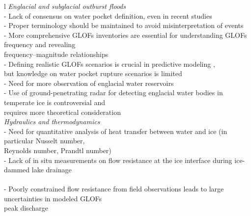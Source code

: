 \begin{table}[h]
\begin{tabular}{l}
\textit{Englacial and subglacial outburst floods}   \\
\hline
- Lack of consensus on water pocket definition, even in recent studies {\citep{Lutzow&al2023,Zhang&al2024}} \\
- Proper terminology should be maintained to avoid misinterpretation of events {\citep{Emmer&al2022}} \\
- More comprehensive GLOFs inventories are essential for understanding GLOFs frequency and revealing\\ frequency–magnitude relationships {\citep{Veh&al2022,Emmer&al2022}} \\
- Defining realistic GLOFs scenarios is crucial in predictive modeling {\citep{Emmer&al2022,Zhang&al2024}},\\ but knowledge on water pocket rupture scenarios is limited {\citep{Haeberli1983}} \\
- Need for more observation of englacial water reservoirs {\citep{Haeberli1983}} \\
- Use of ground-penetrating radar for detecting englacial water bodies in temperate ice is controversial and\\ requires more theoretical consideration {\citep{Murray&al2000,Brown&al2009}} \\

\textit{Hydraulics and thermodynamics}\\
\hline
- Need for quantitative analysis of heat transfer between water and ice (in particular Nusselt number,\\ Reynolds number, Prandtl number) {\citep{Clarke2003,Roberts2005,Bjornsson2010,Sommers&Rajaram2020}} \\
- Lack of in situ measurements on flow resistance at the ice interface during ice-dammed lake drainage\\ {\citep{Clarke2003,Werder&al2010,Vincent&al2010,Kingslake&al2015,Gleason&al2016}} \\
- Poorly constrained flow resistance from field observations leads to large uncertainties in modeled GLOFs\\ peak discharge {\citep{Werder&al2010}} \\


\end{tabular}
\end{table}

